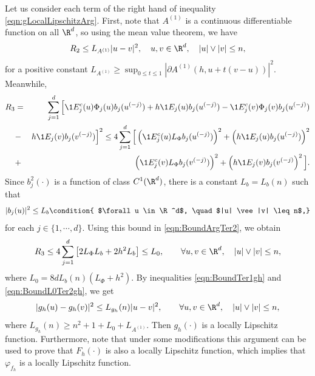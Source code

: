 \documentclass[sort&compress, preprint]{elsarticle}
\theoremstyle{definition}
\theoremstyle{plain}%
\theoremstyle{remark}
\begin{document}
\begin{pf}
	Let us consider each term of the right hand of inequality \eqref{eqn:gLocalLipschitzArg}.
	First, note that $A^{(1)}$ is a continuous differentiable function on all 
	$\R^d$, so using the mean value theorem,
	we have
	\begin{equation}\label{eqn:BoundTer1gh}
		R_2
		\leq
		L_{A^{(1)}}|u-v|^2, \quad u,v \in \R^d, \quad |u|\vee |v|\leq n,
	\end{equation}
	for a positive constant $L_{A^{(1)}} \geq \sup_{0\leq t \leq 1} 
		|\partial A^{(1)}(h, u+t(v-u))|^2$. Meanwhile, 
	\begin{eqnarray}
	R_3 &=&\sum_{j=1}^d\Big[\1{E_j^c}(u) \Phi_j(u) b_j(u^{(-j)}) + h \1{E_j}(u) b_j(u^{(-j)}) 
			-\1{E_j^c}(v) \Phi_j(v) b_j(u^{(-j)})\nonumber \\ &-& h \1{E_j}(v) b_j(v^{(-j)})
			\Big]^2 
			\leq
			4\sum_{j=1}^d
			\Big[
				\left(	
					\1{E_j^c}(u) L_{\Phi} b_j(u^{(-j)})  
				\right)^2
				+
				\left(
					h \1{E_j}(u) b_j(u^{(-j)})
				\right)^2
				\nonumber\\&+&
				\left(
					\1{E_j^c}(v) L_{\Phi} b_j(v^{(-j)})
				\right)^2
				+
				\left(
				 h \1{E_j}(v) b_j(v^{(-j)}
				\right)^2
			\Big].
		\label{eqn:BoundArgTer2}	
	\end{eqnarray}	
	Since  $b^2_j(\cdot)$ is a function of class $C^1(\R^d)$, there is a 
	constant $L_b=L_b(n)$ such that
	\begin{dmath}[label={eqn:Boundbju}]
		|b_j(u)|^2 \leq L_b 
		\condition{
			$\forall u \in \R^d$,
			\quad $|u| \vee |v| \leq n$,}		
	\end{dmath}
	for each $j \in \{1,\cdots, d\}$. Using this bound in  \eqref{eqn:BoundArgTer2}, we obtain
	\begin{equation}\label{eqn:BoundL0Ter2gh}
			R_3\leq
			4 \sum_{j=1}^d
				\left[
					2 L_{\Phi} L_b +2h^2 L_b
				\right] 
			\leq L_0, \qquad
				\forall u,v \in \R^d,
				\quad |u|\vee|v| \leq n,
	\end{equation}
	where $L_0=8d L_b(n)(L_{\Phi}+h^2)$.
	By inequalities \eqref{eqn:BoundTer1gh} and \eqref{eqn:BoundL0Ter2gh},  we get
	\begin{equation}
			|g_h(u) - g_h(v)|^2 \leq L_{g_h}(n) |u - v|^2, 
			\qquad	\forall u,v \in \R^d,
				\quad |u|\vee |v| \leq n,		
	\end{equation}
	 where $L_{g_h}(n)\geq n^2+1+L_0+ L_{A^{(1)}}$. Then $g_h(\cdot)$ is a locally 
	 Lipschitz function. Furthermore, note that under some modifications
	this argument can be used to prove that $F_h(\cdot)$ is also a locally Lipschitz 
	function, which implies that $\varphi_{f_{h}}$ is a locally Lipschitz function.

\end{pf}
\end{document}
